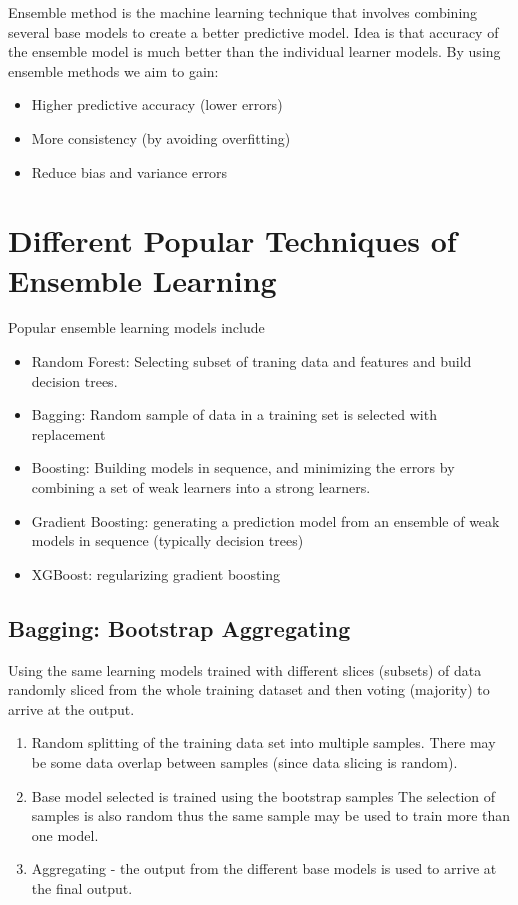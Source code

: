 \documentclass{article}
\begin{document}
Ensemble method is the machine learning technique that involves combining several base models to create a better predictive model. Idea is that accuracy of the ensemble model is much better than the individual learner models. By using ensemble methods we aim to gain:


\begin{itemize}
    \item Higher predictive accuracy (lower errors)
    \item More consistency (by avoiding overfitting)
    \item Reduce bias and variance errors
\end{itemize}

\section{Different Popular Techniques of Ensemble Learning}

Popular ensemble learning models include

\begin{itemize}
    \item Random Forest: Selecting subset of traning data and features and build decision trees. 
    \item Bagging: Random sample of data in a training set is selected with replacement
    \item Boosting: Building models in sequence, and minimizing the errors by combining a set of weak learners into a strong learners. 
    \item Gradient Boosting: generating a prediction model from an ensemble of weak models in sequence (typically decision trees)
    \item XGBoost: regularizing gradient boosting \cite{enwiki:1035329027}
\end{itemize}


\subsection{Bagging: Bootstrap Aggregating}

Using the same learning models trained with different slices (subsets) of data randomly sliced from the whole training dataset and then voting (majority) to arrive at the output.


\begin{enumerate}
    \item Random splitting of the training data set into multiple samples. 
    There may be some data overlap between samples (since data slicing is random).
    \item Base model selected is trained using the bootstrap samples
    The selection of samples is also random thus the same sample may be used to train more than one model.
    \item Aggregating - the output from the different base models is used to arrive at the final output.
\end{enumerate}
\end{document}
